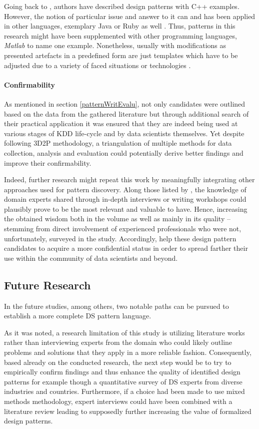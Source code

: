 Going back to \textcite{GoF2002}, authors have described design patterns with C++ examples. 
However, the notion of particular issue and answer to it can and has been applied in other languages, exemplary Java or Ruby as well \parencites{OrelyJavaDP2009}{RubyDP2007}. 
Thus, patterns in this research might have been supplemented with other programming languages, \emph{Matlab} to name one example.
Nonetheless, usually with modifications as presented artefacts in a predefined form are just templates which have to be adjusted due to a variety of faced situations or technologies \parencite{Fowler2002}.

\paragraph*{Confirmability}
As mentioned in section \ref{patternWritEvalu}, not only candidates were outlined based on the data from the gathered literature but through additional search of their practical application it was ensured that they are indeed being used at various stages of \ac{KDD} life-cycle and by data scientists themselves. 
Yet despite following \ac{3D2P} methodology, a triangulation of multiple methods for data collection, analysis and evaluation could potentially derive better findings and improve their confirmability. 

Indeed, further research might repeat this work by meaningfully integrating other approaches used for pattern discovery. 
Along those listed by \textcite{InventadoPeter2015}, the knowledge of domain experts shared through in-depth interviews or writing workshops could plausibly prove to be the most relevant and valuable to have.
Hence, increasing the obtained wisdom both in the volume as well as mainly in its quality -- stemming from direct involvement of experienced professionals who were not, unfortunately, surveyed in the study.
Accordingly, help these design pattern candidates to acquire a more confidential status in order to spread farther their use within the community of data scientists and beyond.

\subsection{Future Research}
\label{futResearch}
In the future studies, among others, two notable paths can be pursued to establish a more complete \ac{DS} pattern language.

As it was noted, a research limitation of this study is utilizing literature works rather than interviewing experts from the domain who could likely outline problems and solutions that they apply in a more reliable fashion. 
Consequently, based already on the conducted research, the next step would be to try to empirically confirm findings and thus enhance the quality of identified design patterns for example though a quantitative survey of \ac{DS} experts from diverse industries and countries.
Furthermore, if a choice had been made to use mixed methods methodology, expert interviews could have been combined with a literature review leading to supposedly further increasing the value of formalized design patterns.

